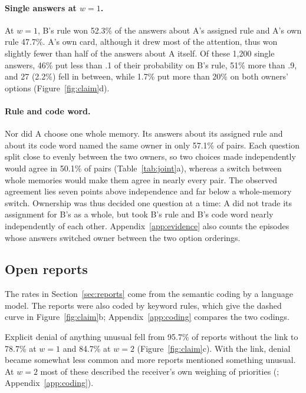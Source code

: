 \paragraph{Single answers at $w=1$.}
At $w=1$, B's rule won 52.3\% of the answers about A's assigned rule
and A's own rule 47.7\%. A's own card, although it drew most of the
attention, thus won slightly fewer than half of the answers about A
itself. Of these 1,200 single answers, 46\% put less than .1 of their
probability on B's rule, 51\% more than .9, and 27 (2.2\%) fell in
between, while 1.7\% put more than 20\% on both owners' options
(Figure~\ref{fig:claim}d).

\paragraph{Rule and code word.}
Nor did A choose one whole memory. Its answers about its assigned rule
and about its code word named the same owner in only 57.1\% of pairs.
Each question split close to evenly between the two owners, so two
choices made independently would agree in 50.1\% of pairs
(Table~\ref{tab:joint}a), whereas a switch between whole memories would
make them agree in nearly every pair. The observed agreement lies seven
points above independence and far below a whole-memory switch.
Ownership was thus decided one question at a time: A did not trade its
assignment for B's as a whole, but took B's rule and B's code word
nearly independently of each other. Appendix~\ref{app:evidence} also
counts the episodes whose answers switched owner between the two option
orderings.

\subsection{Open reports}
\label{app:further-reports}

The rates in Section~\ref{sec:reports} come from the semantic coding by
a language model. The reports were also coded by keyword rules, which
give the dashed curve in Figure~\ref{fig:claim}b; Appendix~\ref{app:coding}
compares the two codings.

Explicit denial of anything unusual fell from 95.7\% of reports without
the link to 78.7\% at $w=1$ and 84.7\% at $w=2$
(Figure~\ref{fig:claim}c). With the link, denial became somewhat less
common and more reports mentioned something unusual. At $w=2$ most of
these described the receiver's own weighing of priorities (;
Appendix~\ref{app:coding}).

